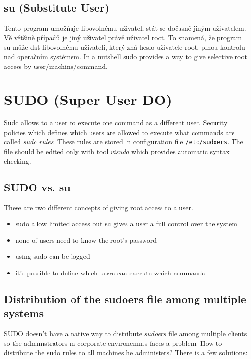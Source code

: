 \documentclass[12pt,a4paper,titlepage,final]{article}
\begin{document}
\subsection{su (Substitute User)}
Tento program umožňuje libovolnému uživateli stát se dočasně jiným uživatelem.
Vě většině případů je jiný uživatel právě uživatel root. To znamená, že program
su může dát libovolnému uživateli, který zná heslo uživatele root, plnou
kontrolu nad operačním systémem. In a nutshell sudo provides a way to give
selective root access by user/machine/command.


\section{SUDO (Super User DO)}

Sudo allows to a user to execute one command as a different user. Security
policies which defines which users are allowed to execute what commands are
called \emph{sudo rules}. These rules are stored in configuration file
\texttt{/etc/sudoers}. The file should be edited only with tool \emph{visudo}
which provides automatic syntax checking.

\subsection{SUDO vs. su}
These are two different concepts of giving root access to a user.

\begin{itemize}
	\item sudo allow limited access but su gives a user a full control over the
		system
	\item none of users need to know the root's password
	\item using sudo can be logged
	\item it's possible to define which users can execute which commands
\end{itemize}


\subsection{Distribution of the sudoers file among multiple systems}
SUDO doesn't have a native way to distribute \emph{sudoers} file among multiple
clients so the administrators in corporate environemnts faces a problem. How to
distribute the sudo rules to all machines he administers? There is a few
solutions:
\end{document}
